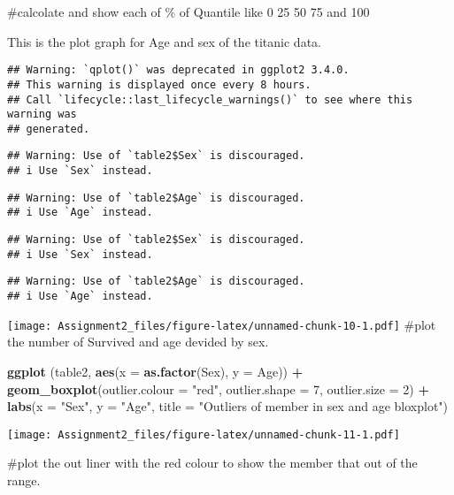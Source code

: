 \documentclass[
]{article}
\newenvironment{Shaded}{\begin{snugshade}}{\end{snugshade}}
\newcommand{\AttributeTok}[1]{\textcolor[rgb]{0.13,0.29,0.53}{#1}}
\newcommand{\DecValTok}[1]{\textcolor[rgb]{0.00,0.00,0.81}{#1}}
\newcommand{\FunctionTok}[1]{\textcolor[rgb]{0.13,0.29,0.53}{\textbf{#1}}}
\newcommand{\NormalTok}[1]{#1}
\newcommand{\SpecialCharTok}[1]{\textcolor[rgb]{0.81,0.36,0.00}{\textbf{#1}}}
\newcommand{\StringTok}[1]{\textcolor[rgb]{0.31,0.60,0.02}{#1}}
\begin{document}
\#calcolate and show each of \% of Quantile like 0 25 50 75 and 100

This is the plot graph for Age and sex of the titanic data.

\begin{Shaded}
\end{Shaded}

\begin{verbatim}
## Warning: `qplot()` was deprecated in ggplot2 3.4.0.
## This warning is displayed once every 8 hours.
## Call `lifecycle::last_lifecycle_warnings()` to see where this warning was
## generated.
\end{verbatim}

\begin{verbatim}
## Warning: Use of `table2$Sex` is discouraged.
## i Use `Sex` instead.
\end{verbatim}

\begin{verbatim}
## Warning: Use of `table2$Age` is discouraged.
## i Use `Age` instead.
\end{verbatim}

\begin{verbatim}
## Warning: Use of `table2$Sex` is discouraged.
## i Use `Sex` instead.
\end{verbatim}

\begin{verbatim}
## Warning: Use of `table2$Age` is discouraged.
## i Use `Age` instead.
\end{verbatim}

\texttt{[image: Assignment2\_files/figure-latex/unnamed-chunk-10-1.pdf]}
\#plot the number of Survived and age devided by sex.

\begin{Shaded}
\begin{Highlighting}[]
\FunctionTok{ggplot}\NormalTok{ (table2, }\FunctionTok{aes}\NormalTok{(}\AttributeTok{x =} \FunctionTok{as.factor}\NormalTok{(Sex), }\AttributeTok{y =}\NormalTok{ Age)) }\SpecialCharTok{+}
  \FunctionTok{geom\_boxplot}\NormalTok{(}\AttributeTok{outlier.colour =} \StringTok{"red"}\NormalTok{, }\AttributeTok{outlier.shape =} \DecValTok{7}\NormalTok{, }\AttributeTok{outlier.size =} \DecValTok{2}\NormalTok{) }\SpecialCharTok{+}
  \FunctionTok{labs}\NormalTok{(}\AttributeTok{x =} \StringTok{"Sex"}\NormalTok{, }\AttributeTok{y =} \StringTok{"Age"}\NormalTok{, }\AttributeTok{title =} \StringTok{"Outliers of member in sex and age bloxplot"}\NormalTok{)}
\end{Highlighting}
\end{Shaded}

\texttt{[image: Assignment2\_files/figure-latex/unnamed-chunk-11-1.pdf]}

\#plot the out liner with the red colour to show the member that out of
the range.
\end{document}
